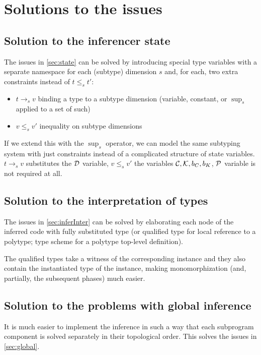 \section{Solutions to the issues}

\subsection{Solution to the inferencer state}

The issues in \cref{sec:state} can be solved by introducing special type variables with a separate namespace for each (subtype) dimension $s$ and, for each, two extra constraints instead of $t \leq_s t'$:

\begin{itemize}
    \item $t \to_s v$ binding a type to a subtype dimension (variable, constant, or $\sup_s$ applied to a set of such)
    \item $v \leq_s v'$ inequality on subtype dimensions
\end{itemize}

If we extend this with the $\sup_s$ operator, we can model the same subtyping system with just constraints instead of a complicated structure of state variables. $t \to_s v$ substitutes the $\mathcal D$ variable, $v \leq_s v'$ the variables $\mathcal C, \mathcal K, b_C, b_K$, $\mathcal P$ variable is not required at all.

\subsection{Solution to the interpretation of types}

The issues in \cref{sec:inferInter} can be solved by elaborating each node of the inferred code with fully substituted type (or qualified type for local reference to a polytype; type scheme for a polytype top-level definition).

The qualified types take a witness of the corresponding instance and they also contain the instantiated type of the instance, making monomorphization (and, partially, the subsequent phases) much easier.

\subsection{Solution to the problems with global inference}
\label{sec:solGlob}

It is much easier to implement the inference in such a way that each subprogram component is solved separately in their topological order. This solves the issues in \cref{sec:global}.

